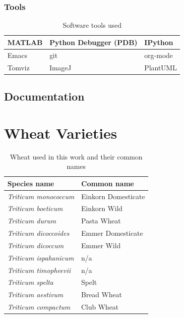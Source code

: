 \documentclass[11pt]{report}
\begin{document}
\subsection{Tools}
\label{sec:orgc210de8}
\begin{table}[htbp]
\caption{\label{tab:org66c29b8}
Software tools used}
\centering
\begin{tabularx}{\textwidth}{|X|X|X|}
\hline
MATLAB & Python Debugger (PDB) & IPython\\
\hline
Emacs & git & org-mode\\
\hline
Tomviz & ImageJ & PlantUML\\
\hline
\end{tabularx}
\end{table}

\section{Documentation}
\label{sec:org524922d}
\clearpage

\chapter{Wheat Varieties}
\label{sec:org23d70e1}
\begin{table}[htbp]
\caption{\label{tab:orge0a0129}
Wheat used in this work and their common names}
\centering
\begin{tabularx}{\textwidth}{|X|X|}
\hline
\textbf{Species name} & \textbf{Common name}\\
\hline
\emph{Triticum monococcum} & Einkorn Domesticate\\
\hline
\emph{Triticum boeticum} & Einkorn Wild\\
\hline
\emph{Triticum durum} & Pasta Wheat\\
\hline
\emph{Triticum dicoccoides} & Emmer Domesticate\\
\hline
\emph{Triticum dicoccum} & Emmer Wild\\
\hline
\emph{Triticum ispahanicum} & n/a\\
\hline
\emph{Triticum timopheevii} & n/a\\
\hline
\emph{Triticum spelta} & Spelt\\
\hline
\emph{Triticum aestivum} & Bread Wheat\\
\hline
\emph{Triticum compactum} & Club Wheat\\
\hline
\end{tabularx}
\end{table}
\end{document}
